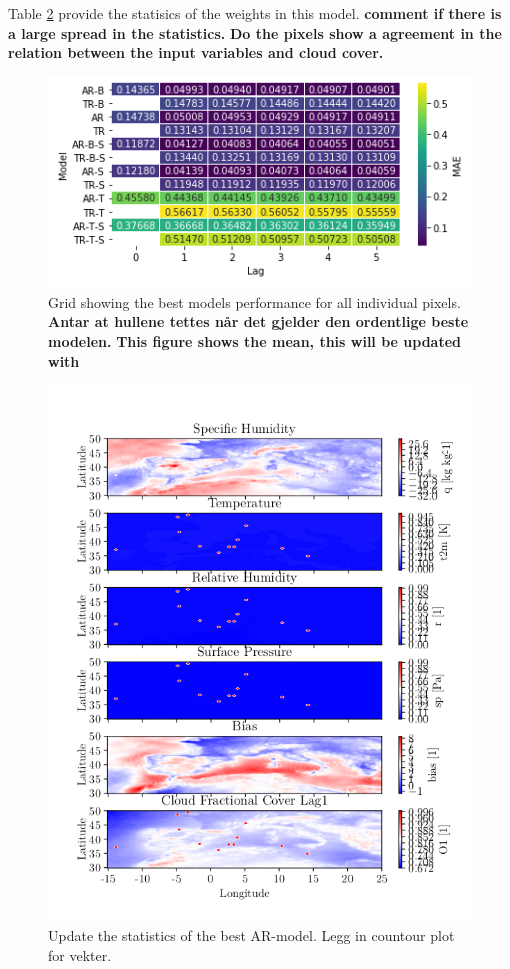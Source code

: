 Table \ref{tab:weights_best_model} provide the statisics of the weights in this model. \textbf{comment if there is a large spread in the statistics.} \textbf{Do the pixels show a agreement in the relation between the input variables and cloud cover.}
\begin{figure}
    \centering
    \includegraphics{ChapterX_Results_and_Conclusion/computational_experiments/heat_ar_model_mae_test_score.png}
    \caption{Grid showing the best models performance for all individual pixels. \textbf{Antar at hullene tettes når det gjelder den ordentlige beste modelen.} \textbf{This figure shows the mean, this will be updated with }}
    \label{fig:grid_mse_best_model}
\end{figure}

\begin{figure}
    \centering
    \includegraphics{python_figs/weights_best_ar_model.png}
    \caption{Update the statistics of the best AR-model. Legg in countour plot for vekter.}
    \label{tab:weights_best_model}
\end{figure}




